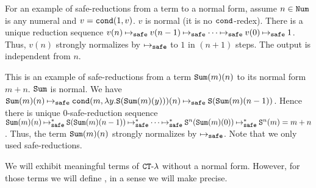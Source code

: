 

\begin{example}
For an example of safe-reductions from a term to a normal form, 
assume $n \in {\tt Num}$ is any numeral and $v = {\tt cond}(1, v)$.
$v$ is normal (it is no ${\tt cond}$-redex).
There is a unique reduction sequence
$v(n) \safeReduces v(n-1) \safeReduces \cdots \safeReduces v(0) \safeReduces 1$. 
Thus, $v(n)$ strongly normalizes by $\safeReduces$ to $1$ in $(n+1)$ steps.
The output is independent from $n$.
\end{example}

\begin{example}
This is an example of safe-reductions from a term ${\tt Sum}(m)(n)$ to
its normal form $m+n$. 
${\tt Sum}$ is normal.
We have $\Sum(m)(n) \safeReduces \cond(m,\lambda y.\Succ(\Sum(m)(y)))(n) \safeReduces \Succ(\Sum(m)(n-1))$.
Hence there is unique $0$-safe-reduction sequence 
$\Sum(m)(n) \safeReducesAst \Succ(\Sum(m)(n-1)) \safeReducesAst \cdots \safeReducesAst \Succ^n(\Sum(m)(0)) \safeReducesAst \Succ^n(m) = m+n$.
Thus, the term ${\tt Sum}(m)(n)$ strongly normalizes by $\safeReduces$.
Note that we only used safe-reductions.
\end{example}

We will exhibit meaningful terms of ${ {\tt CT}\mbox{-}\lambda}$ without a normal form. 
However, for those terms we will define ,
in a sense we will make precise.

